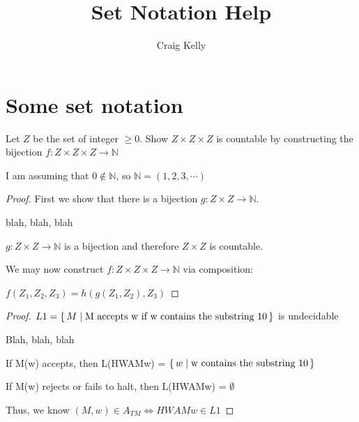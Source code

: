 \documentclass[letterpaper,10pt]{article}
\title{Set Notation Help}
\author{Craig Kelly}
\begin{document}
\setlength{\pdfpageheight}{\paperheight}
\setlength{\pdfpagewidth}{\paperwidth}

\setlength{\parindent}{0pt}
\setlength{\parskip}{6pt}

\maketitle


\section*{Some set notation}

Let $ Z $ be the set of integer $ \geq 0 $.
Show $ Z \times Z \times Z $ is countable by constructing the bijection
$ f:  Z \times Z \times Z \rightarrow \mathbb{N} $

I am assuming that $0 \notin \mathbb{N}$, 
so $\mathbb{N} = (1,2,3, \cdots)$ 


\begin{proof}

First we show that there is a bijection 
$ g: Z \times Z \rightarrow \mathbb{N} $.

blah, blah, blah

$ g: Z \times Z \rightarrow \mathbb{N} $
is a bijection and therefore $Z \times Z$ is countable.

We may now construct $ f:  Z \times Z \times Z \rightarrow \mathbb{N} $
via composition:

$ f(Z_{1}, Z_{2}, Z_{3}) = h(g(Z_{1}, Z_{2}), Z_{3}) $

\end{proof}


\begin{proof}

$ L1 = \set{M | \text{M accepts w if w contains the substring 10} } $
is undecidable

Blah, blah, blah

If M(w) accepts, then L(HWAMw) = $\set{w | \text{w contains the substring 10} }$

If M(w) rejects or fails to halt, then L(HWAMw) = $\emptyset$

Thus, we know
$(M,w) \in A_{TM} \Leftrightarrow HWAMw \in L1$

\end{proof}
\end{document}
